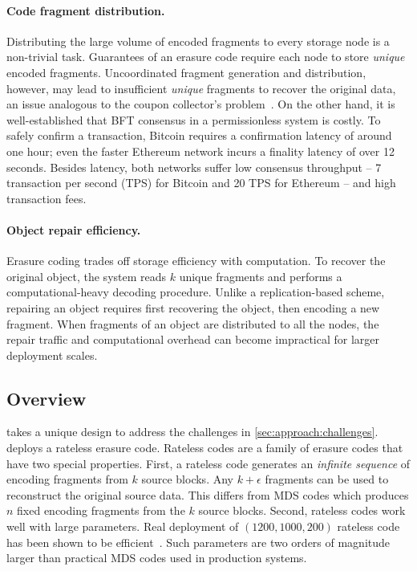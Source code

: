 \paragraph{Code fragment distribution.}
Distributing the large volume of encoded fragments to every storage node is a non-trivial task.
Guarantees of an erasure code require each node to store \emph{unique} encoded fragments.
Uncoordinated fragment generation and distribution, however, may lead to insufficient \emph{unique} fragments to recover the original data, an issue analogous to the coupon collector's problem~\cite{ccp}.
On the other hand, it is well-established that BFT consensus in a permissionless system is costly.
To safely confirm a transaction, Bitcoin requires a confirmation latency of around one hour;
even the faster Ethereum network incurs a finality latency of over 12 seconds.
Besides latency, both networks suffer low consensus throughput -- 7 transaction per second (TPS) for Bitcoin and 20 TPS for Ethereum -- and high transaction fees.

\paragraph{Object repair efficiency.}
Erasure coding trades off storage efficiency with computation.
To recover the original object, the system reads $k$ unique fragments and performs a computational-heavy decoding procedure.
Unlike a replication-based scheme, repairing an object requires first recovering the object, then encoding a new fragment.
When fragments of an object are distributed to all the nodes, the repair traffic and computational overhead can become impractical for larger deployment scales.

\subsection{\sys Overview}
\label{sec:approach:overview}
\sys takes a unique design to address the challenges in \autoref{sec:approach:challenges}.
\sys deploys a rateless erasure code.
Rateless codes are a family of erasure codes that have two special properties.
First, a rateless code generates an \emph{infinite sequence} of encoding fragments from $k$ source blocks.
Any $k + \epsilon$ fragments can be used to reconstruct the original source data.
This differs from MDS codes which produces $n$ fixed encoding fragments from the $k$ source blocks.
Second, rateless codes work well with large parameters.
Real deployment of $(1200, 1000, 200)$ rateless code has been shown to be efficient~\cite{liquid}.
Such parameters are two orders of magnitude larger than practical MDS codes used in production systems.

